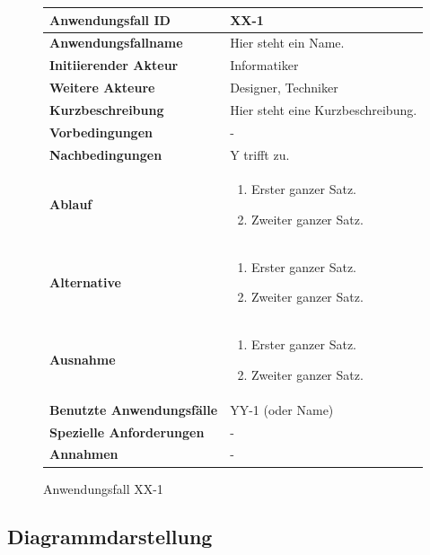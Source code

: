 \begin{figure}[h]
	\centering
	\begin{tabularx}{\textwidth}{ X | X }
		\textbf{Anwendungsfall ID} & XX-1 \\ \hline
		\textbf{Anwendungsfallname} & Hier steht ein Name. \\ \hline
		\textbf{Initiierender Akteur} & Informatiker \\ \hline
		\textbf{Weitere Akteure} & Designer, Techniker  \\ \hline
		\textbf{Kurzbeschreibung} & Hier steht eine Kurzbeschreibung.  \\ \hline
		\textbf{Vorbedingungen} & -  \\ \hline
		\textbf{Nachbedingungen} & Y trifft zu.  \\ \hline
		\textbf{Ablauf} &
		\begin{enumerate}
			\item Erster ganzer Satz.
			\item Zweiter ganzer Satz.
		\end{enumerate} \\ \hline
		\textbf{Alternative} &
		\begin{enumerate}
			\item Erster ganzer Satz.
			\item Zweiter ganzer Satz.
		\end{enumerate}  \\ \hline
		\textbf{Ausnahme} &
		\begin{enumerate}
			\item Erster ganzer Satz.
			\item Zweiter ganzer Satz.
		\end{enumerate}  \\ \hline
		\textbf{Benutzte Anwendungsfälle} & YY-1 (oder Name) \\ \hline
		\textbf{Spezielle Anforderungen} & - \\ \hline
		\textbf{Annahmen} & -
	\end{tabularx}
	\caption{Anwendungsfall XX-1}
	\label{fig:anwendungsfall-server-tabelle-xx-1}
\end{figure}

\clearpage

\subsection{Diagrammdarstellung}

